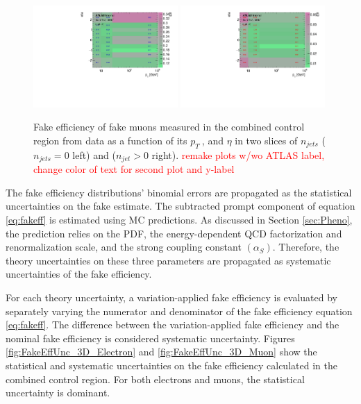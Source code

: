 \begin{figure}[htb]
		\begin{center}
		\includegraphics[width = 0.49\textwidth]{figures/Analysis/Background/njet0_FakeEfficiency3D_mu_pt_eta.pdf}
		\includegraphics[width = 0.49\textwidth]{figures/Analysis/Background/njet1_FakeEfficiency3D_mu_pt_eta.pdf} 
		\end{center}
	\caption{Fake efficiency of fake muons measured in the combined control region from data as a function of its $p_{T}~$, and $\eta$ in two slices of $n_{jets}$ ($n_{jets}=0$ left) and ($n_{jet} > 0$ right). \textcolor{red}{remake plots w/wo ATLAS label, change color of text for second plot and y-label} \label{fig:MuonFakeEff}}
\end{figure}

The fake efficiency distributions' binomial errors are propagated as the statistical uncertainties on the fake estimate. The subtracted prompt component of equation \ref{eq:fakeff} is estimated using MC predictions. As discussed in Section \ref{sec:Pheno}, the prediction relies on the PDF, the energy-dependent QCD factorization and renormalization scale, and the strong coupling constant $(\alpha_{S})$. Therefore, the theory uncertainties on these three parameters are propagated as systematic uncertainties of the fake efficiency. 

For each theory uncertainty, a variation-applied fake efficiency is evaluated by separately varying the numerator and denominator of the fake efficiency equation \ref{eq:fakeff}. The difference between the variation-applied fake efficiency and the nominal fake efficiency is considered systematic uncertainty. Figures \ref{fig:FakeEffUnc_3D_Electron} and \ref{fig:FakeEffUnc_3D_Muon} show the statistical and systematic uncertainties on the fake efficiency calculated in the combined control region. For both electrons and muons, the statistical uncertainty is dominant.

